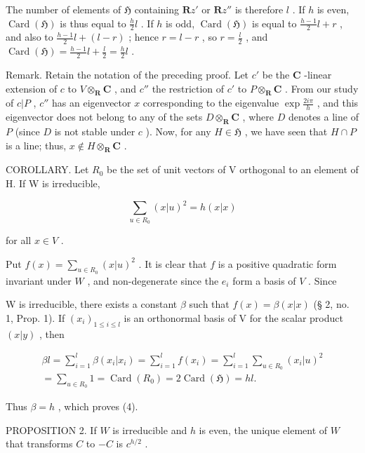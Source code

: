 The number of elements of \(\mathfrak{H}\) containing \(\mathbf{R}z'\) or \(\mathbf{R}z''\) is therefore \(l\) . If \(h\) is even, \(\operatorname{Card}(\mathfrak{H})\) is thus equal to \(\frac{h}{2} l\) . If \(h\) is odd, \(\operatorname{Card}(\mathfrak{H})\) is equal to \(\frac{h - 1}{2} l + r\) , and also to \(\frac{h - 1}{2} l + (l - r)\) ; hence \(r = l - r\) , so \(r = \frac{l}{2}\) , and \(\operatorname{Card}(\mathfrak{H}) = \frac{h - 1}{2} l + \frac{l}{2} = \frac{h}{2} l\) .

Remark. Retain the notation of the preceding proof. Let \(c'\) be the \(\mathbf{C}\) -linear extension of \(c\) to \(V \otimes_{\mathbf{R}} \mathbf{C}\) , and \(c''\) the restriction of \(c'\) to \(P \otimes_{\mathbf{R}} \mathbf{C}\) . From our study of \(c|P\) , \(c''\) has an eigenvector \(x\) corresponding to the eigenvalue \(\exp \frac{2i\pi}{h}\) , and this eigenvector does not belong to any of the sets \(D \otimes_{\mathbf{R}} \mathbf{C}\) , where \(D\) denotes a line of \(P\) (since \(D\) is not stable under \(c\) ). Now, for any \(H \in \mathfrak{H}\) , we have seen that \(H \cap P\) is a line; thus, \(x \notin H \otimes_{\mathbf{R}} \mathbf{C}\) .

COROLLARY. Let \(R_{0}\) be the set of unit vectors of V orthogonal to an element of H. If W is irreducible,

\[
\sum_ {u \in R _ {0}} (x | u) ^ {2} = h (x | x)\tag{4}
\]

for all \(x \in V\) .

Put \(f(x) = \sum_{u \in R_0} (x|u)^2\) . It is clear that \(f\) is a positive quadratic form invariant under \(W\) , and non-degenerate since the \(e_i\) form a basis of \(V\) . Since

W is irreducible, there exists a constant \(\beta\) such that \(f(x) = \beta (x|x)\) (§ 2, no. 1, Prop. 1). If \((x_{i})_{1\leqslant i\leqslant l}\) is an orthonormal basis of V for the scalar product \((x|y)\) , then

\[
\begin{array}{l} \beta l = \sum_ {i = 1} ^ {l} \beta (x _ {i} | x _ {i}) = \sum_ {i = 1} ^ {l} f (x _ {i}) = \sum_ {i = 1} ^ {l} \sum_ {u \in R _ {0}} (x _ {i} | u) ^ {2} \\ = \sum_ {u \in R _ {0}} 1 = \operatorname{Card} (R _ {0}) = 2 \operatorname{Card} (\mathfrak {H}) = h l. \end{array}
\]

Thus \(\beta = h\) , which proves (4).

PROPOSITION 2. If \(W\) is irreducible and \(h\) is even, the unique element of \(W\) that transforms \(C\) to \(-C\) is \(c^{h/2}\) .

